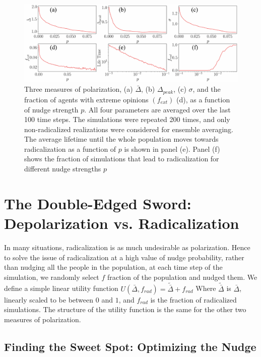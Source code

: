 \begin{figure}[ht]
    \centering
    \includegraphics[width=\textwidth]{chapters/chapter2/new_pol_param.pdf}
    \caption{Three measures of polarization, (a) $\bar\Delta$, (b) $\Delta_{peak}$, (c) $\sigma$, and  the fraction of agents with extreme opinions $(f_{ext})$ (d), as a function of nudge strength $p$. All four parameters are averaged over the last 100 time steps. The simulations were repeated 200 times, and only non-radicalized realizations were considered for ensemble averaging. The average lifetime until the whole population moves towards radicalization as a function of $p$ is shown in panel (e). Panel (f) shows the fraction of simulations that lead to radicalization for different nudge strengths $p$}
    \label{fig:pol_par}
\end{figure}

\section{The Double-Edged Sword: Depolarization vs. Radicalization}

In many situations, radicalization is as much undesirable as polarization. Hence to solve the issue of radicalization at a high value of nudge probability, rather than nudging all the people in the population, at each time step of the simulation, we randomly select $f$ fraction of the population and nudged them. We define a simple linear utility function $U(\bar \Delta, f_{rad}) = \tilde{\bar \Delta} + f_{rad}$
Where $\tilde{\bar \Delta}$ is $\bar \Delta$, linearly scaled to be between $0$ and $1$, and $f_{rad}$ is the fraction of radicalized
simulations. The structure of the utility function is the same for the other two measures of polarization.

\subsection{Finding the Sweet Spot: Optimizing the Nudge}

